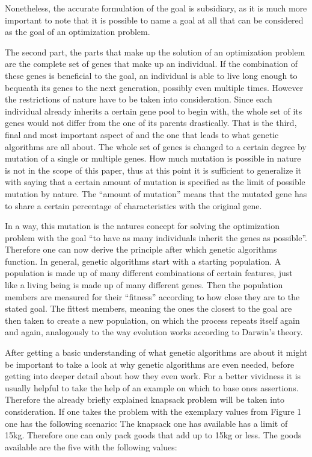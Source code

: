 \documentclass[11pt,a4paper]{article}
\begin{document}
Nonetheless, the accurate formulation of the goal is subsidiary, as it is much more important to note that it is possible to name a goal at all that can be considered as the goal of an optimization problem.

The second part, the parts that make up the solution of an optimization problem are the complete set of genes that make up an individual. If the combination of these genes is beneficial to the goal, an individual is able to live long enough to bequeath its genes to the next generation, possibly even multiple times. However the restrictions of nature have to be taken into consideration. Since each individual already inherits a certain gene pool to begin with, the whole set of its genes would not differ from the one of its parents drastically. 
That is the third, final and most important aspect of and the one that leads to what genetic algorithms are all about. The whole set of genes is changed to a certain degree by mutation of a single or multiple genes. How much mutation is possible in nature is not in the scope of this paper, thus at this point it is sufficient to generalize it with saying that a certain amount of mutation is specified as the limit of possible mutation by nature. The “amount of mutation” means that the mutated gene has to share a certain percentage of characteristics with the original gene.

In a way, this mutation is the natures concept for solving the optimization problem with the goal “to have as many individuals inherit the genes as possible”. Therefore one can now derive the principle after which genetic algorithms function. In general, genetic algorithms start with a starting population. A population is made up of many different combinations of certain features, just like a living being is made up of many different genes. Then the population members are measured for their “fitness” according to how close they are to the stated goal. The fittest members, meaning the ones the closest to the goal are then taken to create a new population, on which the process repeats itself again and again, analogously to the way evolution works according to Darwin’s theory.

After getting a basic understanding of what genetic algorithms are about it might be important to take a look at why genetic algorithms are even needed, before getting into deeper detail about how they even work.
For a better vividness it is usually helpful to take the help of an example on which to base ones assertions. Therefore the already briefly explained knapsack problem will be taken into consideration.
If one takes the problem with the exemplary values from Figure 1 one has the following scenario:
The knapsack one has available has a limit of 15kg. Therefore one can only pack goods that add up to 15kg or less.
The goods available are the five with the following values:
\end{document}
